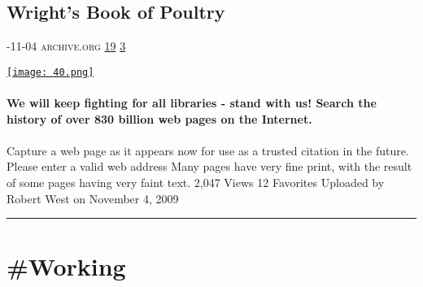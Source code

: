 \documentclass[10pt,a4paper]{article}
\begin{document}
\begin{multicols*}{2}
\begin{minipage}{\linewidth}
\subsection{Wright's Book of Poultry}
\textsc{\footnotesize
{\scriptsize\faCalendar}-11-04 
{\scriptsize\faGlobe}\space 
archive.org 
{\scriptsize\faThumbsOUp}\space 
\href{http://news.ycombinator.com/item?id=37129799\&utm\_term=comment}{19} 
{\scriptsize\faComments}\space 
\href{http://news.ycombinator.com/item?id=37129799\&utm\_term=comment}{3} 
}
\par\medskip\noindent
\href{https://archive.org/details/wrightsbookofpou00wrig?utm\_source=hackernewsletter\&utm\_medium=email\&utm\_term=books}{
    \texttt{[image: 40.png]}
}
\end{minipage}
\paragraph{}
\textbf{We will keep fighting for all libraries - stand with us!
Search the history of over 830 billion
web pages
on the Internet.}
\paragraph{}

Capture a web page as it appears now for use as a trusted citation in the future.
Please enter a valid web address
Many pages have very fine print, with the result of some pages having very faint text.
2,047
Views
12
Favorites
Uploaded by
Robert West
on November 4, 2009
\par\noindent\textcolor{red}{\rule{\linewidth}{0.2mm}}
\vfill
\null
\end{multicols*}

\newpage
\section{\#Working}
\end{document}
